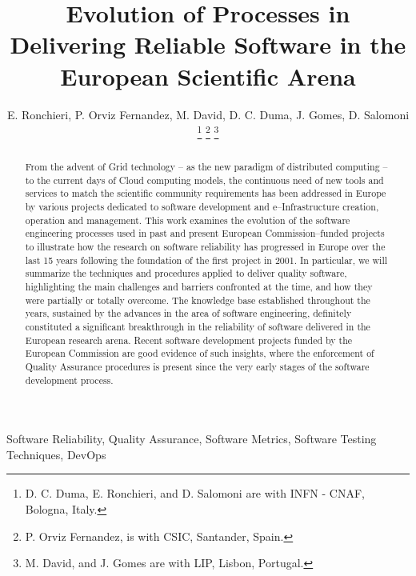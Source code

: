 \documentclass[journal]{IEEEtran}
\begin{document}
\title{Evolution of Processes in Delivering Reliable Software in the European Scientific Arena}

\author{E. Ronchieri,
        P. Orviz Fernandez,
        M. David,
        D. C. Duma,
        J. Gomes,
        D. Salomoni
\thanks{D. C. Duma, E. Ronchieri, and D. Salomoni are with INFN - CNAF, Bologna, Italy.}
\thanks{P. Orviz Fernandez, is with CSIC, Santander, Spain.}
\thanks{M. David, and J. Gomes are with LIP, Lisbon, Portugal.}%
}

\maketitle

\begin{abstract}

From the advent of Grid technology -- as the new paradigm of distributed
computing -- to the current days of Cloud computing models, the continuous need
of new tools and services to match the scientific community requirements has been
addressed in Europe by various projects dedicated to software development
and e--Infrastructure creation, operation and management.
This work examines the evolution of the software engineering processes used in past and
present European Commission--funded projects to illustrate how the research on software
reliability has progressed in Europe over the last 15 years following the foundation of the
first project in 2001. In particular, we will summarize the techniques and procedures
applied to deliver quality software, highlighting the main challenges and barriers confronted
at the time, and how they were partially or totally overcome. The knowledge base established
throughout the years, sustained by the advances in the area of software engineering,
definitely constituted a significant breakthrough in the reliability of software delivered in the
European research arena. Recent software development projects funded by the European
Commission are good evidence of such insights, where the enforcement of Quality Assurance
procedures is present since the very early stages of the software development process.

\end{abstract}

\begin{IEEEkeywords}
Software Reliability, Quality Assurance, Software Metrics, Software Testing
Techniques, DevOps
\end{IEEEkeywords}

\IEEEpeerreviewmaketitle
\end{document}
